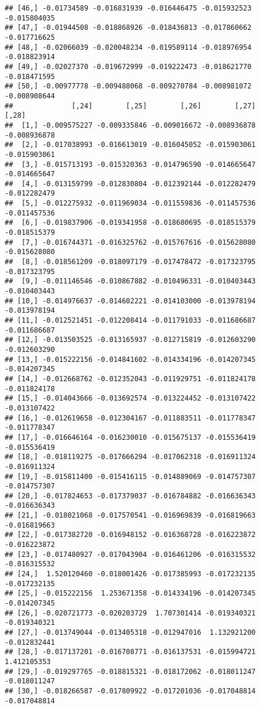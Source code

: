 \documentclass[
]{article}
\begin{document}
\begin{verbatim}
## [46,] -0.01734589 -0.016831939 -0.016446475 -0.015932523 -0.015804035
## [47,] -0.01944508 -0.018868926 -0.018436813 -0.017860662 -0.017716625
## [48,] -0.02066039 -0.020048234 -0.019589114 -0.018976954 -0.018823914
## [49,] -0.02027370 -0.019672999 -0.019222473 -0.018621770 -0.018471595
## [50,] -0.00977778 -0.009488068 -0.009270784 -0.008981072 -0.008908644
##              [,24]        [,25]        [,26]        [,27]        [,28]
##  [1,] -0.009575227 -0.009335846 -0.009016672 -0.008936878 -0.008936878
##  [2,] -0.017038993 -0.016613019 -0.016045052 -0.015903061 -0.015903061
##  [3,] -0.015713193 -0.015320363 -0.014796590 -0.014665647 -0.014665647
##  [4,] -0.013159799 -0.012830804 -0.012392144 -0.012282479 -0.012282479
##  [5,] -0.012275932 -0.011969034 -0.011559836 -0.011457536 -0.011457536
##  [6,] -0.019837906 -0.019341958 -0.018680695 -0.018515379 -0.018515379
##  [7,] -0.016744371 -0.016325762 -0.015767616 -0.015628080 -0.015628080
##  [8,] -0.018561209 -0.018097179 -0.017478472 -0.017323795 -0.017323795
##  [9,] -0.011146546 -0.010867882 -0.010496331 -0.010403443 -0.010403443
## [10,] -0.014976637 -0.014602221 -0.014103000 -0.013978194 -0.013978194
## [11,] -0.012521451 -0.012208414 -0.011791033 -0.011686687 -0.011686687
## [12,] -0.013503525 -0.013165937 -0.012715819 -0.012603290 -0.012603290
## [13,] -0.015222156 -0.014841602 -0.014334196 -0.014207345 -0.014207345
## [14,] -0.012668762 -0.012352043 -0.011929751 -0.011824178 -0.011824178
## [15,] -0.014043666 -0.013692574 -0.013224452 -0.013107422 -0.013107422
## [16,] -0.012619658 -0.012304167 -0.011883511 -0.011778347 -0.011778347
## [17,] -0.016646164 -0.016230010 -0.015675137 -0.015536419 -0.015536419
## [18,] -0.018119275 -0.017666294 -0.017062318 -0.016911324 -0.016911324
## [19,] -0.015811400 -0.015416115 -0.014889069 -0.014757307 -0.014757307
## [20,] -0.017824653 -0.017379037 -0.016784882 -0.016636343 -0.016636343
## [21,] -0.018021068 -0.017570541 -0.016969839 -0.016819663 -0.016819663
## [22,] -0.017382720 -0.016948152 -0.016368728 -0.016223872 -0.016223872
## [23,] -0.017480927 -0.017043904 -0.016461206 -0.016315532 -0.016315532
## [24,]  1.520120460 -0.018001426 -0.017385993 -0.017232135 -0.017232135
## [25,] -0.015222156  1.253671358 -0.014334196 -0.014207345 -0.014207345
## [26,] -0.020721773 -0.020203729  1.707301414 -0.019340321 -0.019340321
## [27,] -0.013749044 -0.013405318 -0.012947016  1.132921200 -0.012832441
## [28,] -0.017137201 -0.016708771 -0.016137531 -0.015994721  1.412105353
## [29,] -0.019297765 -0.018815321 -0.018172062 -0.018011247 -0.018011247
## [30,] -0.018266587 -0.017809922 -0.017201036 -0.017048814 -0.017048814

\end{verbatim}
\end{document}

